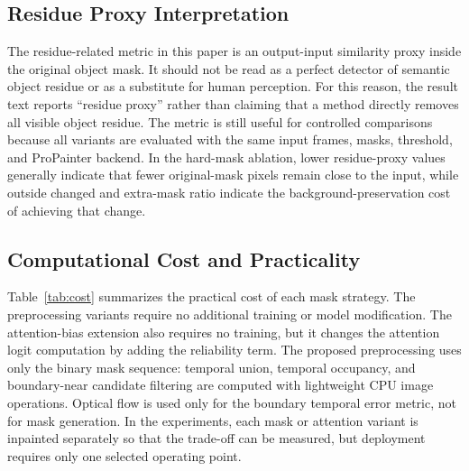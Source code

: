 \documentclass[nouppercase]{kaia}
\begin{document}
\subsection{Residue Proxy Interpretation}
The residue-related metric in this paper is an output-input similarity proxy inside the original object mask. It should not be read as a perfect detector of semantic object residue or as a substitute for human perception. For this reason, the result text reports ``residue proxy'' rather than claiming that a method directly removes all visible object residue. The metric is still useful for controlled comparisons because all variants are evaluated with the same input frames, masks, threshold, and ProPainter backend. In the hard-mask ablation, lower residue-proxy values generally indicate that fewer original-mask pixels remain close to the input, while outside changed and extra-mask ratio indicate the background-preservation cost of achieving that change.
\subsection{Computational Cost and Practicality}
Table~\ref{tab:cost} summarizes the practical cost of each mask strategy. The preprocessing variants require no additional training or model modification. The attention-bias extension also requires no training, but it changes the attention logit computation by adding the reliability term. The proposed preprocessing uses only the binary mask sequence: temporal union, temporal occupancy, and boundary-near candidate filtering are computed with lightweight CPU image operations. Optical flow is used only for the boundary temporal error metric, not for mask generation. In the experiments, each mask or attention variant is inpainted separately so that the trade-off can be measured, but deployment requires only one selected operating point.
\end{document}

